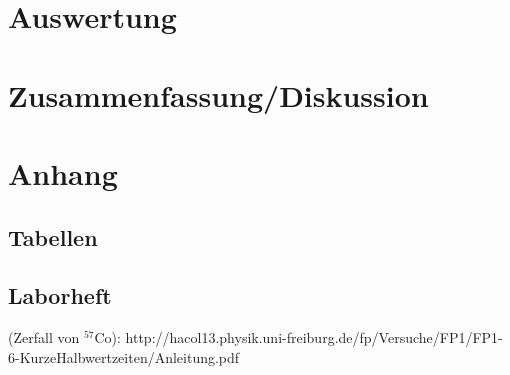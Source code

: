 \documentclass[12pt]{article}
\begin{document}
\newpage
\section{Auswertung}


\newpage
\section{Zusammenfassung/Diskussion}


\newpage
\section{Anhang}

\subsection{Tabellen}

%


%

\newpage
\subsection{Laborheft}

\newpage
\listoffigures


\newpage
\thispagestyle{empty}
\begin{thebibliography}{9}

 (Zerfall von $^{57}$Co): http://hacol13.physik.uni-freiburg.de/fp/Versuche/FP1/FP1-6-KurzeHalbwertzeiten/Anleitung.pdf
  

  
  

\end{thebibliography}
\end{document}

